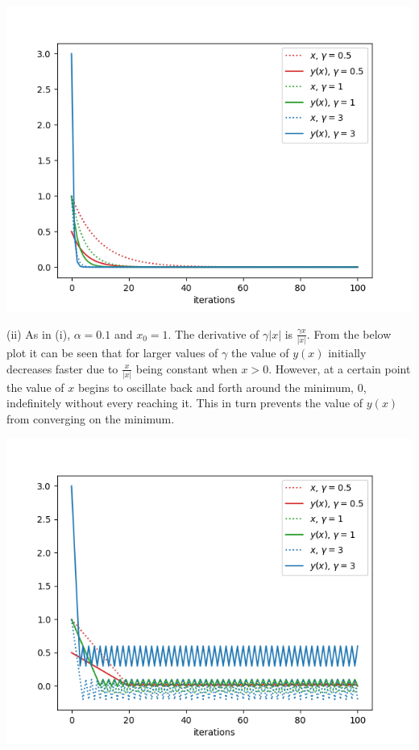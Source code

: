 \documentclass[12pt]{article}
\begin{document}
\begin{center}
    \includegraphics[scale=0.55]{figs/c/c_i.png}
\end{center}

\noindent (ii) As in (i), $\alpha=0.1$ and $x_0=1$. The derivative of $\gamma|x|$ is $\frac{\gamma x}{|x|}$. From the below plot it can be seen that for larger values of $\gamma$ the value of $y(x)$ initially decreases faster due to $\frac{x}{|x|}$ being constant when $x > 0$. However, at a certain point the value of $x$ begins to oscillate back and forth around the minimum, 0, indefinitely without every reaching it. This in turn prevents the value of $y(x)$ from converging on the minimum.

\begin{center}
    \includegraphics[scale=0.55]{figs/c/c_ii.png}
\end{center}
\end{document}
